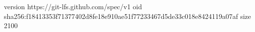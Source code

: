 version https://git-lfs.github.com/spec/v1
oid sha256:f18413353f71377402d8fe18e910ae51f77233467d5de33c018e8424119a07af
size 2100
